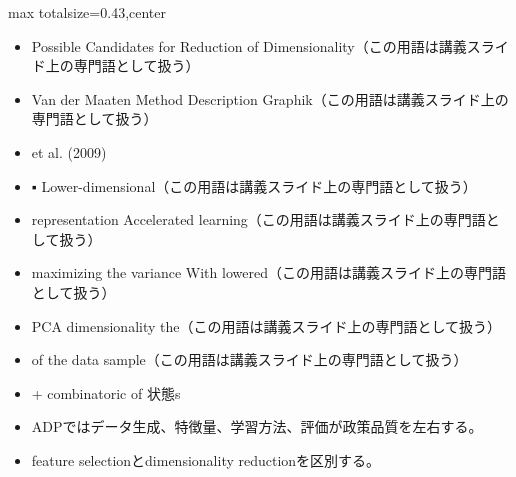\clearpage
{}
\begin{minipage}[t]{0.405\textwidth}
\begin{adjustbox}{max totalsize={\textwidth}{0.43\textheight},center}
\begin{minipage}{\textwidth}\scriptsize
{}\begin{itemize}
\item Possible Candidates for Reduction of Dimensionality（この用語は講義スライド上の専門語として扱う）
\item Van der Maaten Method Description Graphik（この用語は講義スライド上の専門語として扱う）
\item et al. (2009)
\item ▪ Lower-dimensional（この用語は講義スライド上の専門語として扱う）
\item representation Accelerated learning（この用語は講義スライド上の専門語として扱う）
\item maximizing the variance With lowered（この用語は講義スライド上の専門語として扱う）
\item PCA dimensionality the（この用語は講義スライド上の専門語として扱う）
\item of the data sample（この用語は講義スライド上の専門語として扱う）
\item + combinatoric of 状態s
\end{itemize}\begin{itemize}
\item ADPではデータ生成、特徴量、学習方法、評価が政策品質を左右する。
\item feature selectionとdimensionality reductionを区別する。
\end{itemize}
\end{minipage}
\end{adjustbox}
\end{minipage}\hfill
